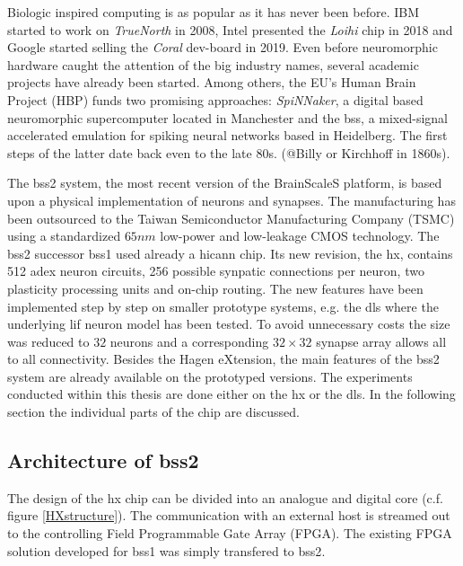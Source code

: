 Biologic inspired computing is as popular as it has never been before. IBM started to work on \textit{TrueNorth} in 2008, Intel presented the \textit{Loihi} chip in 2018 and Google started selling the \textit{Coral} dev-board in 2019. Even before neuromorphic hardware caught the attention of the big industry names, several academic projects have already been started. Among others, the EU's Human Brain Project (HBP) funds two promising approaches: \textit{SpiNNaker}, a digital based neuromorphic supercomputer located in Manchester and the \gls{bss}, a mixed-signal accelerated emulation for spiking neural networks based in Heidelberg. The first steps of the latter date back even to the late 80s. (@Billy or Kirchhoff in 1860s).

The \gls{bss2} system, the most recent version of the BrainScaleS platform, is based upon a physical implementation of neurons and synapses. The manufacturing has been outsourced to the Taiwan Semiconductor Manufacturing Company (TSMC) using a standardized $65 \si{nm}$ low-power and low-leakage CMOS technology. The \gls{bss2} successor \gls{bss1} used already a \gls{hicann} chip. Its new revision, the \gls{hx}, contains 512 \gls{adex} neuron circuits, 256 possible synpatic connections per neuron, two plasticity processing units and on-chip routing. The new features have been implemented step by step on smaller prototype systems, e.g. the \gls{dls} where the underlying \gls{lif} neuron model has been tested. To avoid unnecessary costs the size was reduced to $32$ neurons and a corresponding $32 \times 32$ synapse array allows all to all connectivity. Besides the Hagen eXtension, the main features of the \gls{bss2} system are already available on the prototyped versions.  The experiments conducted within this thesis are done either on the \gls{hx} or the \gls{dls}. In the following section the individual parts of the chip are discussed.




\subsection{Architecture of \gls{bss2}}

The design of the \gls{hx} chip can be divided into an analogue and digital core (c.f. figure \ref{HXstructure}). The communication with an external host is streamed out to the controlling Field Programmable Gate Array (FPGA). The existing FPGA solution developed for \gls{bss1} was simply transfered to \gls{bss2}.

